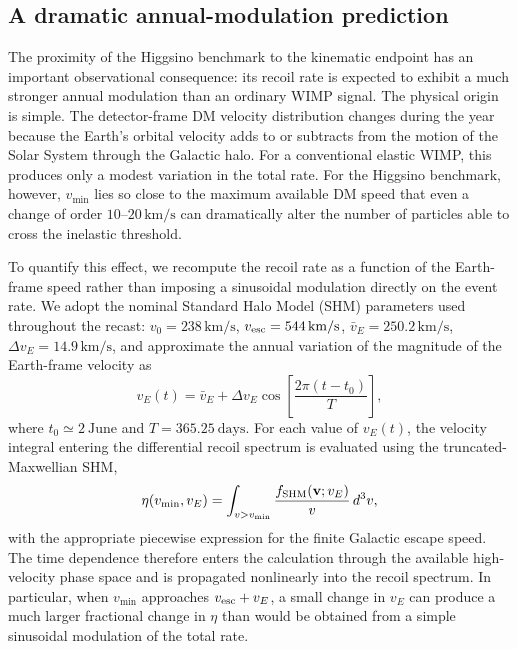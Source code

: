 \documentclass[aps,prd,reprint,superscriptaddress,nofootinbib,longbibliography,floatfix]{revtex4-2}
\begin{document}
\subsection{A dramatic annual-modulation prediction}

The proximity of the Higgsino benchmark to the kinematic endpoint has an important observational consequence: its recoil rate is expected to exhibit a much stronger annual modulation than an ordinary WIMP signal. The physical origin is simple. The detector-frame DM velocity distribution changes during the year because the Earth's orbital velocity adds to or subtracts from the motion of the Solar System through the Galactic halo. For a conventional elastic WIMP, this produces only a modest variation in the total rate. For the Higgsino benchmark, however, $v_{\min}$ lies so close to the maximum available DM speed that even a change of order $10$--$20\,\mathrm{km/s}$ can dramatically alter the number of particles able to cross the inelastic threshold.

To quantify this effect, we recompute the recoil rate as a function of the Earth-frame speed rather than imposing a sinusoidal modulation directly on the event rate. We adopt the nominal Standard Halo Model (SHM) parameters used throughout the recast: $v_0=238\,\mathrm{km/s}$, $v_{\rm esc}=544\,\mathrm{km/s}$, $\bar v_E=250.2\,\mathrm{km/s}$, $\Delta v_E=14.9\,\mathrm{km/s}$,
and approximate the annual variation of the magnitude of the Earth-frame velocity as
\begin{equation}
v_E(t)=\bar v_E+\Delta v_E
\cos\left[
\frac{2\pi(t-t_0)}{T}
\right],
\end{equation}
where $t_0\simeq 2~\mathrm{June}$ and $T=365.25~\mathrm{days}$.
For each value of $v_E(t)$, the velocity integral entering the differential recoil spectrum is evaluated using the truncated-Maxwellian SHM,
\begin{equation}
\eta(v_{\min},v_E)
=
\int_{v>v_{\min}}
\frac{f_{\rm SHM}(\mathbf v;v_E)}{v}\,d^3v,
\end{equation}
with the appropriate piecewise expression for the finite Galactic escape speed. The time dependence therefore enters the calculation through the available high-velocity phase space and is propagated nonlinearly into the recoil spectrum. In particular, when $v_{\min}$ approaches $v_{\rm esc}+v_E$, a small change in $v_E$ can produce a much larger fractional change in $\eta$ than would be obtained from a simple sinusoidal modulation of the total rate.
\end{document}
